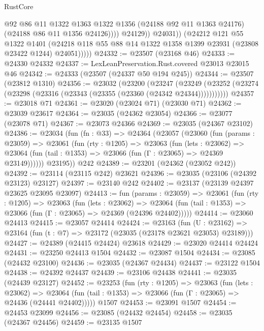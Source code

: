 \begin{lexlean}{RustCore}
\begin{coremodule}
                        @92
                        @86
                        @11
                        @1322
                        @1363
                        @1322
                        @1356
                        (@24188 @92 @11 @1363 @24176)
                        (@24188 @86 @11 @1356 @24126))))
                  @24129))
              @24031))
          (@24212
            @121
            @55
            @1322
            @1401
            (@24218 @118 @55 @88 @14 @1322 @1358 @1399 @23931 (@23808 @23422 @1244) @24051)))))
@24332 := @23507 (@23168 @46)
@24333 := @24330 @24332
@24337 := LexLeanPreservation.Rust.covered @23013 @23015 @46
@24342 := @24333 (@23507 (@24337 @50 @194 @245))
@24344 := @23507 (@23812 @1310)
@24356 := @23032
    (@23200
      (@23247
        (@23249 (@23252 (@23274 (@23298 (@23316 (@23343 (@23355 (@23360 (@24342 @24344)))))))))))
@24357 := @23018 @71
@24361 := @23020 (@23024 @71) (@23030 @71)
@24362 := @23039 @23617
@24364 := @23035 (@24362 @23054)
@24366 := @23077 (@23078 @71)
@24367 := @23073 @24366
@24369 := @23035 (@24367 @23102)
@24386 := @23034
    (fun (fn : @33) =>
    @24364
      (@23057
        (@23060
          (fun (params : @23059) =>
          @23061
            (fun (rty : @1205) =>
            @23063
              (fun (lets : @23062) =>
              @23064 (fun (tail : @1353) => @23066 (fun (Γ : @23065) => @24369 @23149))))))
        @23195))
    @242
@24389 := @23201 (@24362 (@23052 @242))
@24392 := @23114 (@23115 @242) @23621
@24396 := @23035 (@23106 (@24392 @23123) @23127)
@24397 := @23140 @242
@24402 := @23137 (@23139 @24397 @23625 @23095 @23097)
@24413 := fun (params : @23059) =>
  @23061
    (fun (rty : @1205) =>
    @23063
      (fun (lets : @23062) =>
      @23064 (fun (tail : @1353) => @23066 (fun (Γ : @23065) => @24369 (@24396 @24402)))))
@24414 := @23060 @24413
@24415 := @23057 @24414
@24424 := @23163
    (fun (U : @23162) => @23164 (fun (t : @7) => @23172 (@23035 (@23178 @23621 @23053) @23189)))
@24427 := @24389 (@24415 @24424) @23618
@24429 := @23020 @24414 @24424
@24431 := @23250 @24413 @1504
@24432 := @23087 @1504
@24434 := @23085 (@24432 @23100)
@24436 := @23035 (@24367 @24434)
@24437 := @23122 @1504
@24438 := @24392 @24437
@24439 := @23106 @24438
@24441 := @23035 (@24439 @23127)
@24452 := @23253
    (fun (rty : @1205) =>
    @23063
      (fun (lets : @23062) =>
      @23064 (fun (tail : @1353) => @23066 (fun (Γ : @23065) => @24436 (@24441 @24402)))))
    @1507
@24453 := @23091 @1507
@24454 := @24453 @23099
@24456 := @23085 (@24432 @24454)
@24458 := @23035 (@24367 @24456)
@24459 := @23135 @1507

\end{coremodule}
\end{lexlean}
